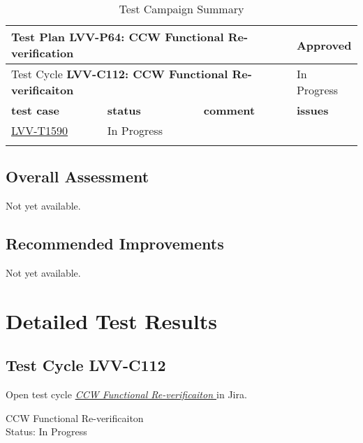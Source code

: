 \documentclass[SE,lsstdraft,STR,toc]{lsstdoc}
\begin{document}
\begin{longtable}{p{2cm}p{2.5cm}p{9cm}p{2.5cm}}
\toprule
\multicolumn{3}{l}{ Test Plan {\bf LVV-P64:  CCW Functional Re-verification
 }} & Approved \\\hline

  \multicolumn{3}{l}{ Test Cycle {\bf LVV-C112:  CCW Functional Re-verificaiton
 }} & In Progress \\\hline

  {\bf \footnotesize test case} & {\bf \footnotesize status} & {\bf \footnotesize comment} & {\bf \footnotesize issues} \\\toprule

    \href{https://jira.lsstcorp.org/secure/Tests.jspa#/testCase/LVV-T1590}{LVV-T1590}
    & In Progress &
    \begin{minipage}[]{9cm}
    \smallskip
    
    \medskip
    \end{minipage}
    &
    \\\hline
\caption{Test Campaign Summary}
\label{table:summary}
\end{longtable}

\subsection{Overall Assessment}
\label{sect:overallassessment}

Not yet available.

\subsection{Recommended Improvements}
\label{sect:recommendations}

Not yet available.

\newpage
\section{Detailed Test Results}
\label{sect:detailedtestresults}

\subsection{Test Cycle LVV-C112 }

Open test cycle {\it \href{https://jira.lsstcorp.org/secure/Tests.jspa#/testrun/LVV-C112}{ CCW Functional Re-verificaiton
}} in Jira.

 CCW Functional Re-verificaiton
\\
Status: In Progress
\end{document}
